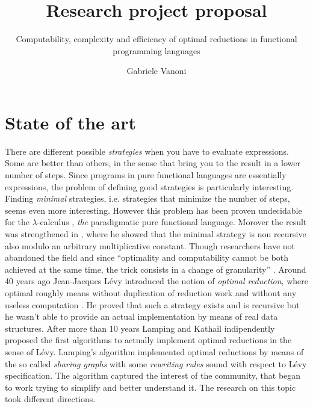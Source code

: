 \documentclass[english]{scrartcl}
\begin{document}
\title{Research project proposal}
\subtitle{Computability, complexity and efficiency of optimal reductions in functional programming languages}
\author{Gabriele Vanoni}
\date{}
\maketitle
\section{State of the art}
There are different possible \emph{strategies} when you have to evaluate expressions. Some are better than others, in the sense that bring you to the result in a lower number of steps. Since programs in pure functional languages are essentially expressions, the problem of defining good strategies is particularly interesting. Finding \emph{minimal} strategies, i.e. strategies that minimize the number of steps, seems even more interesting. However this problem has been proven undecidable for the $\lambda$-calculus \cite[Section~13.5]{barendregt_lambda_1984}, \emph{the} paradigmatic pure functional language. Morover the result was strengthened in \cite{kathail_optimal_1990}, where he showed that the minimal strategy is non recursive also modulo an arbitrary multiplicative constant. Though researchers have not abandoned the field and since ``optimality and computability cannot be both achieved at the same time, the trick consists in a change of granularity'' \cite{terese_term_2003}. Around 40 years ago Jean-Jacques Lévy introduced the notion of \emph{optimal reduction}, where optimal roughly means without duplication of reduction work and without any useless computation \cite{levy_reductions_1978}. He proved that such a strategy exists and is recursive but he wasn't able to provide an actual implementation by means of real data structures. After more than 10 years Lamping \cite{lamping_algorithm_1990} and Kathail \cite{kathail_optimal_1990} indipendently proposed the first algorithms to actually implement optimal reductions in the sense of Lévy. Lamping's algorithm implemented optimal reductions by means of the so called \emph{sharing graphs} with some \emph{rewriting rules} sound with respect to Lévy specification. The algorithm captured the interest of the community, that began to work trying to simplify and better understand it. The research on this topic took different directions.
\end{document}
